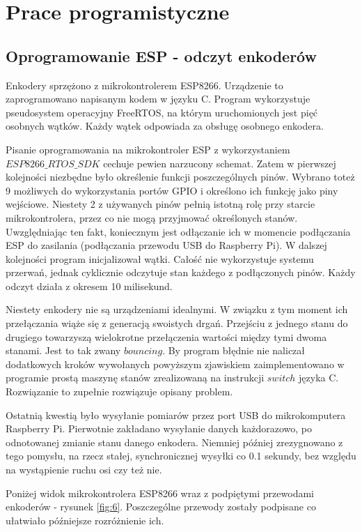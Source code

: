 \section{Prace programistyczne}




\subsection{Oprogramowanie ESP - odczyt enkoderów}

Enkodery sprzężono z mikrokontrolerem ESP8266. Urządzenie to zaprogramowano napisanym kodem w języku C. Program wykorzystuje pseudosystem operacyjny FreeRTOS, na którym uruchomionych jest pięć osobnych wątków. Każdy wątek odpowiada za obsługę osobnego enkodera.

Pisanie oprogramowania na mikrokontroler ESP z wykorzystaniem $ESP8266\_RTOS\_SDK$ cechuje pewien narzucony schemat. Zatem w pierwszej kolejności niezbędne było określenie funkcji poszczególnych pinów. Wybrano toteż 9 możliwych do wykorzystania portów GPIO i określono ich funkcję jako piny wejściowe. Niestety 2 z używanych pinów pełnią istotną rolę przy starcie mikrokontrolera, przez co nie mogą przyjmować określonych stanów. Uwzględniając ten fakt, koniecznym jest odłączanie ich w momencie podłączania ESP do zasilania (podłączania przewodu USB do Raspberry Pi). 
W dalszej kolejności program inicjalizował wątki. Całość nie wykorzystuje systemu przerwań, jednak cyklicznie odczytuje stan każdego z podłączonych pinów. Każdy odczyt działa z okresem 10 milisekund.

Niestety enkodery nie są urządzeniami idealnymi. W związku z tym moment ich przełączania wiąże się z generacją swoistych drgań. Przejściu z jednego stanu do drugiego towarzyszą wielokrotne przełączenia wartości między tymi dwoma stanami. Jest to tak zwany $bouncing$. By program błędnie nie naliczał dodatkowych kroków wywołanych powyższym zjawiskiem zaimplementowano w programie prostą maszynę stanów zrealizowaną na instrukcji $switch$ języka C. Rozwiązanie to zupełnie rozwiązuje opisany problem. \cite{ESP_enc_file} 

Ostatnią kwestią było wysyłanie pomiarów przez port USB do mikrokomputera Raspberry Pi. Pierwotnie zakładano wysyłanie danych każdorazowo, po odnotowanej zmianie stanu danego enkodera. Niemniej później zrezygnowano z tego pomysłu, na rzecz stałej, synchronicznej wysyłki co 0.1 sekundy, bez względu na wystąpienie ruchu osi czy też nie. 

Poniżej widok  mikrokontrolera ESP8266 wraz z podpiętymi przewodami enkoderów - rysunek \ref{fig:6}. Poszczególne przewody zostały podpisane co ułatwiało późniejsze rozróżnienie ich.

